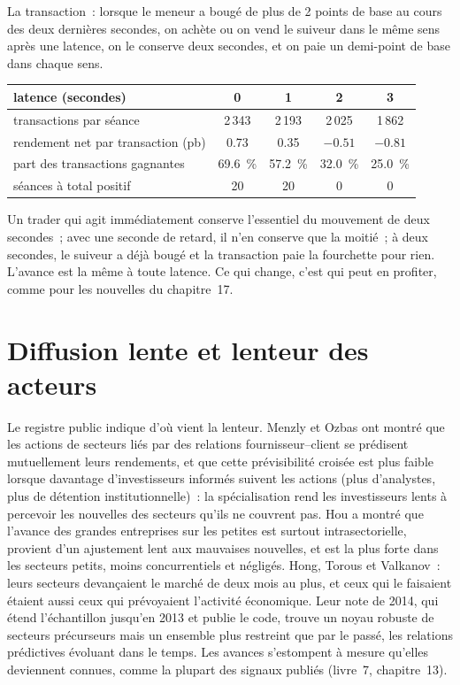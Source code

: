 La transaction~: lorsque le meneur a bougé de plus de 2 points de base au cours des deux dernières secondes, on achète ou on vend le suiveur dans le même sens après une latence,
on le conserve deux secondes, et on paie un demi-point de base dans chaque sens.

\begin{center}
\small
\begin{tabular}{@{}lcccc@{}}
\toprule
latence (secondes) & 0 & 1 & 2 & 3\\
\midrule
transactions par séance & 2\,343 & 2\,193 & 2\,025 & 1\,862\\
rendement net par transaction (pb) & 0.73 & 0.35 & $-0.51$ & $-0.81$\\
part des transactions gagnantes & 69.6~\% & 57.2~\% & 32.0~\% & 25.0~\%\\
séances à total positif & 20 & 20 & 0 & 0\\
\bottomrule
\end{tabular}
\end{center}

Un trader qui agit immédiatement conserve l'essentiel du mouvement de deux secondes~; avec une seconde de retard, il n'en conserve que la moitié~; à deux secondes, le suiveur a déjà bougé et la
transaction paie la fourchette pour rien. L'avance est la même à toute latence. Ce qui change, c'est qui peut en profiter, comme pour les nouvelles du chapitre~17.

\section{Diffusion lente et lenteur des acteurs}

Le registre public indique d'où vient la lenteur. Menzly et Ozbas ont montré que les actions de secteurs liés par des relations fournisseur--client se prédisent
mutuellement leurs rendements, et que cette prévisibilité croisée est plus faible lorsque davantage d'investisseurs informés suivent les actions (plus d'analystes, plus de
détention institutionnelle)~: la spécialisation rend les investisseurs lents à percevoir les nouvelles des secteurs qu'ils ne couvrent pas. Hou a montré que l'avance des grandes entreprises sur les petites
est surtout intrasectorielle, provient d'un ajustement lent aux mauvaises nouvelles, et est la plus forte dans les secteurs petits, moins concurrentiels et négligés. Hong,
Torous et Valkanov~: leurs secteurs devançaient le marché de deux mois au plus, et ceux qui le faisaient étaient aussi ceux qui prévoyaient
l'activité économique. Leur note de 2014, qui étend l'échantillon jusqu'en 2013 et publie le code, trouve un noyau robuste de secteurs précurseurs mais un ensemble plus restreint que par le passé,
les relations prédictives évoluant dans le temps. Les avances s'estompent à mesure qu'elles deviennent connues, comme la plupart des signaux publiés (livre~7, chapitre~13).

